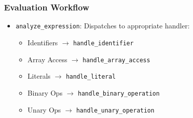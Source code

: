 \documentclass[12pt,a4paper]{article}
\begin{document}
\subsubsection*{Evaluation Workflow}
\begin{itemize}
	\item \texttt{analyze\_expression}: Dispatches to appropriate handler:
	      \begin{itemize}
		      \item Identifiers $\rightarrow$ \texttt{handle\_identifier}
		      \item Array Access $\rightarrow$ \texttt{handle\_array\_access}
		      \item Literals $\rightarrow$ \texttt{handle\_literal}
		      \item Binary Ops $\rightarrow$ \texttt{handle\_binary\_operation}
		      \item Unary Ops $\rightarrow$ \texttt{handle\_unary\_operation}
	      \end{itemize}
\end{itemize}
\end{document}
